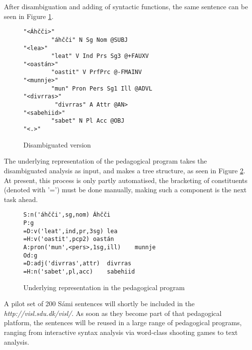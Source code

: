 \documentclass[a4paper,english]{article}
\begin{document}
After disambiguation and adding of syntactic functions, the same sentence can be seen in Figure \ref{fatherdis}.

\begin{figure}[htdp]
\caption{Disambiguated version}
\begin{center}
\begin{verbatim}
"<Áhčči>"
        "áhčči" N Sg Nom @SUBJ
"<lea>"
        "leat" V Ind Prs Sg3 @+FAUXV
"<oastán>"
        "oastit" V PrfPrc @-FMAINV
"<munnje>"
        "mun" Pron Pers Sg1 Ill @ADVL
"<divrras>"
         "divrras" A Attr @AN>
"<sabehiid>"
        "sabet" N Pl Acc @OBJ
"<.>"
\end{verbatim}
\end{center}
\label{fatherdis}
\end{figure}%

The underlying representation of the pedagogical program takes the disambiguated analysis as input, and makes a tree structure, as seen in Figure \ref{underlying}. At present, this process is only partly automatised, the bracketing of constituents (denoted with '=') must be done manually, making such a component is the next task ahead.

\begin{figure}[htdp]
\caption{Underlying representation in the pedagogical program}
\begin{center}
\begin{verbatim}
S:n('áhčči',sg,nom)	Áhčči
P:g
=D:v('leat',ind,pr,3sg)	lea
=H:v('oastit',pcp2)	oastán
A:pron('mun',<pers>,1sg,ill)	munnje
Od:g
=D:adj('divrras',attr)  divrras
=H:n('sabet',pl,acc)	sabehiid
\end{verbatim}
\end{center}
\label{underlying}
\end{figure}%

A pilot set of 200 Sámi sentences will shortly be included in the \textit{http://visl.sdu.dk/visl/}. As soon as they become part of that pedagogical platform, the sentences will be reused in a large range of pedagogical programs, ranging from interactive syntax analysis via word-class shooting games to text analysis.

\end{document}
